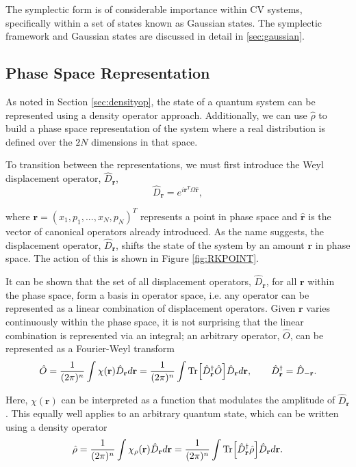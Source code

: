 \documentclass[11pt,a4paper,openbib]{article}
\numberwithin{equation}{section}
\begin{document}
The symplectic form is of considerable importance within CV systems, specifically within a set of states known as Gaussian states. The symplectic framework and Gaussian states are discussed in detail in \ref{sec:gaussian}. 

\subsection{Phase Space Representation}

As noted in Section \ref{sec:densityop}, the state of a quantum system can be represented using a density operator approach. Additionally, we can use $\hat{\rho}$ to build a phase space representation of the system where a real distribution is defined over the $2N$ dimensions in that space. 

To transition between the representations, we must first introduce the  Weyl displacement operator, $\hat{D}_\textbf{r}$, \cite{Olivares12}
\begin{equation} \label{eq:13}
\hat{D}_\mathbf{r} = e^{i\mathbf{r}^{T}\Omega\mathbf{\hat{r}}}, 
\end{equation}

where $\mathbf{r} = (x_1, p_1, ..., x_N, p_N)^T $ represents a point in phase space and $\mathbf{\hat{r}}$ is the vector of canonical operators already introduced. As the name suggests, the displacement operator, $\hat{D}_\mathbf{r}$, shifts the state of the system by an amount $\mathbf{r}$ in phase space. The action of this is shown in Figure \ref{fig:RKPOINT}. 

It can be shown that the set of all displacement operators, $\hat{D}_\mathbf{r}$, for all $\mathbf{r}$ within the phase space, form a basis in operator space, i.e. any operator can be represented as a linear combination of displacement operators. Given $\mathbf{r}$ varies continuously within the phase space, it is not surprising that the linear combination is represented via an integral; an arbitrary operator, $\hat{O}$, can be represented as a Fourier-Weyl transform \cite{Cahill68}
\begin{equation} \label{eq:14}
\hat{O} = \frac{1}{(2\pi)^n}\int \chi(\mathbf{r})\hat{D}_\textbf{r}  d\textbf{r} = \frac{1}{(2\pi)^n} \int \Tr[\hat{D}_\textbf{r}^\dagger\hat{O}]\hat{D}_\textbf{r}  d\textbf{r}, \qquad \hat{D}_\mathbf{r}^\dagger  = \hat{D}_\mathbf{-r}.
\end{equation}  

Here, $\chi(\mathbf{r})$ can be interpreted as a function that modulates the amplitude of $\hat{D}_\textbf{r}$. This equally well applies to an arbitrary quantum state, which can be written using a density operator
\begin{equation} \label{eq:15}
\hat{\rho} = \frac{1}{(2\pi)^n} \int \chi_\rho(\mathbf{r})\hat{D}_\textbf{r}  d\textbf{r} = \frac{1}{(2\pi)^n} \int \Tr[\hat{D}_\textbf{r}^\dagger \hat{\rho}]\hat{D}_\textbf{r}  d\textbf{r}.
\end{equation} 
\end{document}
